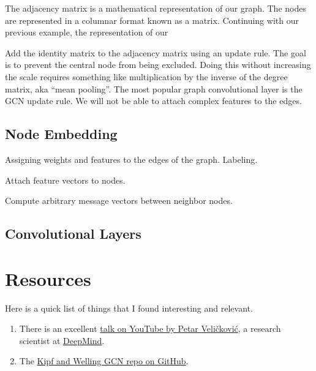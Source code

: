 \justifying
The adjacency matrix is a mathematical representation of our graph. The nodes are represented in a
columnar format known as a matrix. Continuing with our previous example, the representation of our

Add the identity matrix to the adjacency matrix using an update rule. 
The goal is to prevent the central node from being excluded. Doing this without increasing the scale requires something like multiplication by the inverse of the degree matrix, aka ``mean pooling''. The
most popular graph convolutional layer is the GCN update rule. We will not be able to attach complex features to the edges.

\subsection{\label{sec:embedding}Node Embedding}

\justifying
Assigning weights and features to the edges of the graph. Labeling.

Attach feature vectors to nodes.

Compute arbitrary message vectors between neighbor nodes.

\subsection{\label{sec:conv}Convolutional Layers}

\section{\label{sec:reading}Resources}

\justifying
Here is a quick list of things that I found interesting and relevant.

\begin{raggedright}
	\begin{enumerate}
		\item There is an excellent \href{https://www.youtube.com/watch?v=8owQBFAHw7E}{talk on YouTube by Petar Veličković}, a research scientist at \href{https://deepmind.com/about}{DeepMind}.
		\item The \href{https://github.com/tkipf/gcn}{Kipf and Welling GCN repo on GitHub}.
    \end{enumerate}
\end{raggedright}
\vspace{2mm}

\clearpage
\begin{versionhistory}
\end{versionhistory}
\nocite{*}




